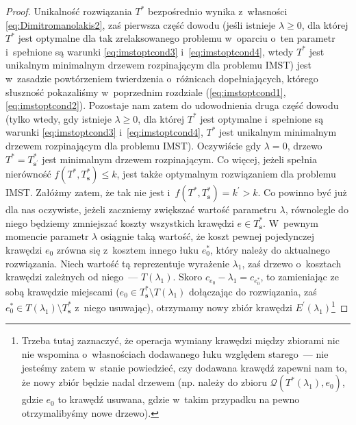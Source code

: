 \begin{proof}
	Unikalność rozwiązania $T^{\ast}$ bezpośrednio wynika z~własności \ref{eq:Dimitromanolakis2}, zaś pierwsza część dowodu (jeśli istnieje $\lambda \geqslant 0$, dla której $T^{\ast}$ jest optymalne dla tak zrelaksowanego problemu w~oparciu o~ten parametr i~spełnione są warunki \ref{eq:imstoptcond3} i~\ref{eq:imstoptcond4}, wtedy $T^{\ast}$ jest unikalnym minimalnym drzewem rozpinającym dla problemu \textsc{IMST}) jest w~zasadzie powtórzeniem twierdzenia o~różnicach dopełniających, którego słuszność pokazaliśmy w~poprzednim rozdziale (\ref{eq:imstoptcond1}, \ref{eq:imstoptcond2}).
	Pozostaje nam zatem do udowodnienia druga część dowodu (tylko wtedy, gdy istnieje $\lambda \geqslant 0$, dla której $T^{\ast}$ jest optymalne i~spełnione są warunki \ref{eq:imstoptcond3} i~\ref{eq:imstoptcond4}, $T^{\ast}$ jest unikalnym minimalnym drzewem rozpinającym dla problemu \textsc{IMST}).
	Oczywiście gdy $\lambda = 0$, drzewo $T^{\ast} = T^{\ast}_{\textbf{s}^{\prime}}$ jest minimalnym drzewem rozpinającym.
	Co więcej, jeżeli spełnia nierówność $f \left( T^{\ast}, T^{\ast}_{\textbf{s}} \right) \leqslant k$, jest także optymalnym rozwiązaniem dla problemu \textsc{IMST}.
	Załóżmy zatem, że tak nie jest i~$f \left( T^{\ast}, T^{\ast}_{\textbf{s}} \right) = k^{\prime} > k$.
	Co powinno być już dla nas oczywiste, jeżeli zaczniemy zwiększać wartość parametru $\lambda$, równolegle do niego będziemy zmniejszać koszty wszystkich krawędzi $e \in T^{\ast}_{\textbf{s}}$.
	W~pewnym momencie parametr $\lambda$ osiągnie taką wartość, że koszt pewnej pojedynczej krawędzi $e_{0}$ zrówna się z~kosztem innego łuku $e_{0}^{\ast}$, który należy do aktualnego rozwiązania.
	Niech wartość tą reprezentuje wyrażenie $\lambda_{1}$, zaś drzewo o~kosztach krawędzi zależnych od niego~--- $T \left( \lambda_{1} \right)$.
	Skoro $c_{e_{0}} - \lambda_{1} = c_{e_{0}^{\ast}}$, to zamieniając ze sobą krawędzie miejscami ($e_{0} \in T^{\ast}_{\textbf{s}} \setminus T \left( \lambda_{1} \right)$ dołączając do rozwiązania, zaś $e_{0}^{\ast} \in T \left( \lambda_{1} \right) \setminus T^{\ast}_{\textbf{s}}$ z~niego usuwając), otrzymamy nowy zbiór krawędzi $E^{\prime} \left( \lambda_{1} \right)$\footnote{
		Trzeba tutaj zaznaczyć, że operacja wymiany krawędzi między zbiorami nic nie wspomina o~własnościach dodawanego łuku względem starego~--- nie jesteśmy zatem w~stanie powiedzieć, czy dodawana krawędź zapewni nam to, że nowy zbiór będzie nadal drzewem (np. należy do zbioru $\mathcal{Q} \left( T^{\ast} \left( \lambda_{1} \right), e_{0} \right)$, gdzie $e_{0}$ to krawędź usuwana, gdzie w~takim przypadku na pewno otrzymalibyśmy nowe drzewo).
}
\end{proof}
